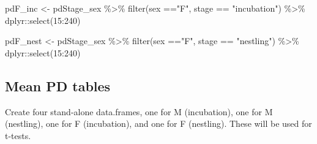 \documentclass[
]{article}
\newenvironment{Shaded}{\begin{snugshade}}{\end{snugshade}}
\newcommand{\FunctionTok}[1]{\textcolor[rgb]{0.00,0.00,0.00}{#1}}
\newcommand{\NormalTok}[1]{#1}
\newcommand{\OtherTok}[1]{\textcolor[rgb]{0.56,0.35,0.01}{#1}}
\newcommand{\SpecialCharTok}[1]{\textcolor[rgb]{0.00,0.00,0.00}{#1}}
\newcommand{\StringTok}[1]{\textcolor[rgb]{0.31,0.60,0.02}{#1}}
\begin{document}
\begin{Shaded}
\begin{Highlighting}[]
\NormalTok{pdF\_inc }\OtherTok{\textless{}{-}}\NormalTok{ pdStage\_sex }\SpecialCharTok{\%\textgreater{}\%}
  \FunctionTok{filter}\NormalTok{(sex }\SpecialCharTok{==}\StringTok{"F"}\NormalTok{, stage }\SpecialCharTok{==} \StringTok{"incubation"}\NormalTok{) }\SpecialCharTok{\%\textgreater{}\%}
\NormalTok{  dplyr}\SpecialCharTok{::}\FunctionTok{select}\NormalTok{(}\StringTok{\textquotesingle{}15\textquotesingle{}}\SpecialCharTok{:}\StringTok{\textquotesingle{}240\textquotesingle{}}\NormalTok{)}
         
\NormalTok{pdF\_nest }\OtherTok{\textless{}{-}}\NormalTok{ pdStage\_sex }\SpecialCharTok{\%\textgreater{}\%}
  \FunctionTok{filter}\NormalTok{(sex }\SpecialCharTok{==}\StringTok{"F"}\NormalTok{, stage }\SpecialCharTok{==} \StringTok{"nestling"}\NormalTok{) }\SpecialCharTok{\%\textgreater{}\%}
\NormalTok{  dplyr}\SpecialCharTok{::}\FunctionTok{select}\NormalTok{(}\StringTok{\textquotesingle{}15\textquotesingle{}}\SpecialCharTok{:}\StringTok{\textquotesingle{}240\textquotesingle{}}\NormalTok{)}
\end{Highlighting}
\end{Shaded}

\hypertarget{mean-pd-tables}{%
\subsection{Mean PD tables}\label{mean-pd-tables}}

Create four stand-alone data.frames, one for M (incubation), one for M
(nestling), one for F (incubation), and one for F (nestling). These will
be used for t-tests.
\end{document}
